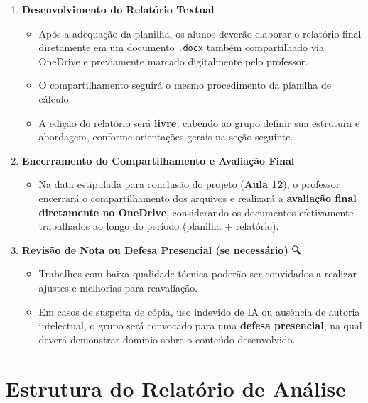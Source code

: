\documentclass[
  a4paper,
]{book}
\providecommand{\tightlist}{%
  \setlength{\itemsep}{0pt}\setlength{\parskip}{0pt}}\usepackage{longtable,booktabs,array}
\begin{document}
\begin{enumerate}
\def\labelenumi{\arabic{enumi}.}
\setcounter{enumi}{4}
\item
  \textbf{Desenvolvimento do Relatório Textual} 📝

  \begin{itemize}
  \item
    Após a adequação da planilha, os alunos deverão elaborar o relatório
    final diretamente em um documento \texttt{.docx} também
    compartilhado via OneDrive e previamente marcado digitalmente pelo
    professor.
  \item
    O compartilhamento seguirá o mesmo procedimento da planilha de
    cálculo.\\
  \item
    A edição do relatório será \textbf{livre}, cabendo ao grupo definir
    sua estrutura e abordagem, conforme orientações gerais na seção
    seguinte.
  \end{itemize}
\item
  \textbf{Encerramento do Compartilhamento e Avaliação Final} 📅

  \begin{itemize}
  \tightlist
  \item
    Na data estipulada para conclusão do projeto (\textbf{Aula 12}), o
    professor encerrará o compartilhamento dos arquivos e realizará a
    \textbf{avaliação final diretamente no OneDrive}, considerando os
    documentos efetivamente trabalhados ao longo do período (planilha +
    relatório).
  \end{itemize}
\item
  \textbf{Revisão de Nota ou Defesa Presencial (se necessário)} 🔍

  \begin{itemize}
  \item
    Trabalhos com baixa qualidade técnica poderão ser convidados a
    realizar ajustes e melhorias para reavaliação.\\
  \item
    Em casos de suspeita de cópia, uso indevido de IA ou ausência de
    autoria intelectual, o grupo será convocado para uma \textbf{defesa
    presencial}, na qual deverá demonstrar domínio sobre o conteúdo
    desenvolvido.
  \end{itemize}
\end{enumerate}

\section{Estrutura do Relatório de Análise
📑}\label{estrutura-do-relatuxf3rio-de-anuxe1lise}
\end{document}
